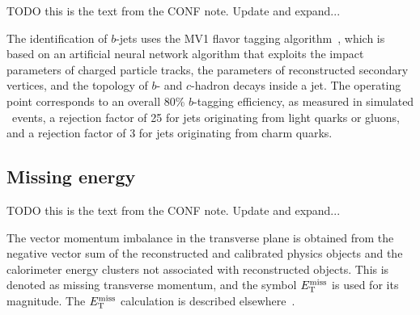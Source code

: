 {\color{red} TODO this is the text from the CONF note. Update and expand...}

The identification of $b$-jets uses the MV1 flavor tagging
algorithm~\cite{ATLAS-CONF-2014-004, ATLAS-CONF-2014-046}, which is
based on an artificial neural network
algorithm that exploits the impact parameters of charged particle
tracks, the parameters of reconstructed secondary vertices, and the
topology of $b$- and $c$-hadron decays inside a jet.  The operating
point corresponds to an overall 80\% $b$-tagging efficiency, as
measured in simulated \TTBAR\ events, a rejection factor of 25 for jets
originating from light quarks or gluons, and a rejection factor of
3 for jets originating from charm quarks.

\FloatBarrier
\subsection{Missing energy} 
\label{sec:met}

{\color{red} TODO this is the text from the CONF note. Update and expand...}

The vector momentum imbalance in the transverse plane is obtained from
the negative vector sum of the reconstructed and calibrated physics
objects and the calorimeter energy clusters not associated with reconstructed
objects. This is denoted as missing transverse momentum, and the symbol
$E_{\mathrm{T}}^{\mathrm{miss}}$ is used for its magnitude.  The $E_{\mathrm{T}}^{\mathrm{miss}}$ calculation is described
elsewhere~\cite{ATLAS-CONF-2013-082}.
 

